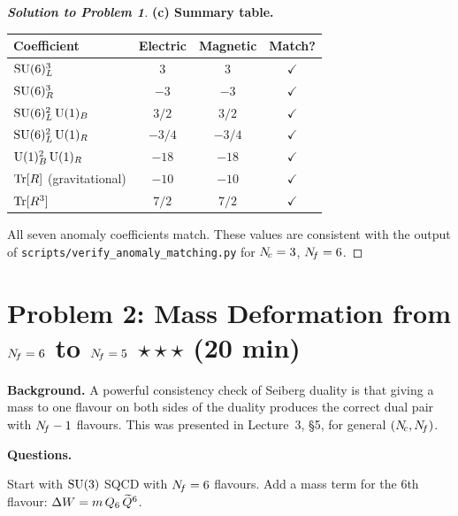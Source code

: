 \documentclass[11pt,a4paper]{article}
\begin{document}
\begin{proof}[\textbf{Solution to Problem 1}]
\bigskip

\textbf{(c) Summary table.}

\begin{center}
\renewcommand{\arraystretch}{1.3}
\begin{tabular}{@{}l c c c@{}}
\toprule
\textbf{Coefficient} & \textbf{Electric} & \textbf{Magnetic} & \textbf{Match?} \\
\midrule
$\mathrm{SU}(6)_L^3$ & $3$ & $3$ & $\checkmark$ \\
$\mathrm{SU}(6)_R^3$ & $-3$ & $-3$ & $\checkmark$ \\
$\mathrm{SU}(6)_L^2\,\mathrm{U}(1)_B$ & $3/2$ & $3/2$ & $\checkmark$ \\
$\mathrm{SU}(6)_L^2\,\mathrm{U}(1)_R$ & $-3/4$ & $-3/4$ & $\checkmark$ \\
$\mathrm{U}(1)_B^2\,\mathrm{U}(1)_R$ & $-18$ & $-18$ & $\checkmark$ \\
$\mathrm{Tr}[R]$ (gravitational) & $-10$ & $-10$ & $\checkmark$ \\
$\mathrm{Tr}[R^3]$ & $7/2$ & $7/2$ & $\checkmark$ \\
\bottomrule
\end{tabular}
\end{center}

All seven anomaly coefficients match.  These values are
consistent with the output of
\texttt{scripts/verify\_anomaly\_matching.py} for $N_{\!c} = 3$,
$N_{\!f} = 6$.
\end{proof}

\newpage


\section*{Problem 2: Mass Deformation from $N_{\!f} = 6$ to $N_{\!f} = 5$
  \hfill $\star\star\star$ \normalsize(20 min)}
\label{prob:mass-deformation}

\noindent\textbf{Background.}
A powerful consistency check of Seiberg duality is that giving a mass
to one flavour on both sides of the duality produces the correct dual
pair with $N_{\!f} - 1$ flavours.  This was presented in
Lecture~3, \S5, for general $(N_{\!c}, N_{\!f})$.

\medskip

\noindent\textbf{Questions.}

Start with $\mathrm{SU}(3)$ SQCD with $N_{\!f} = 6$ flavours.  Add a mass term for
the 6th flavour: $\Delta W = m\, Q_6\, \widetilde{Q}^6$.
\end{document}
